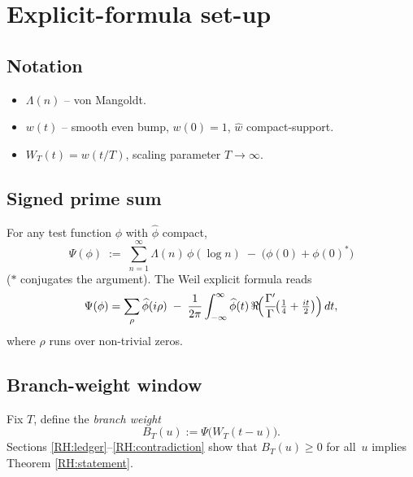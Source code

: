 \section{Explicit-formula set-up}\label{RH:setup}

\subsection{Notation}
\begin{itemize}
  \item $\Lambda(n)$ – von Mangoldt.
  \item $w(t)$ – smooth even bump, $w(0)=1$, $\widehat w$ compact‐support.
  \item $W_T(t)=w(t/T)$, scaling parameter $T\to\infty$.
\end{itemize}

\subsection{Signed prime sum}
For any test function $\phi$ with $\widehat\phi$ compact,
\[
\Psi(\phi)\;:=\;\sum_{n=1}^{\infty}\Lambda(n)\,\phi(\log n)
        \;-\;\bigl(\phi(0)+\phi(0)^*\bigr)
\]
($*$ conjugates the argument).  The Weil explicit formula reads
\begin{equation}\label{eq:explicit}
\Psi(\phi)=
\sum_{\rho}\widehat\phi(i\rho)
\;-\;\frac{1}{2\pi}\int_{-\infty}^{\infty}
       \widehat\phi(t)\,\Re\!\Bigl(\frac{\Gamma'}{\Gamma}\!\bigl(\tfrac14+\tfrac{it}{2}\bigr)\Bigr)\,dt,
\end{equation}
where $\rho$ runs over non-trivial zeros.

\subsection{Branch-weight window}
Fix $T$, define the \emph{branch weight}
\[
B_T(u):=\Psi\!\bigl(W_T(t-u)\bigr).
\]
Sections \ref{RH:ledger}–\ref{RH:contradiction} show that
$B_T(u)\ge0$ for all~$u$ implies Theorem \ref{RH:statement}. 
